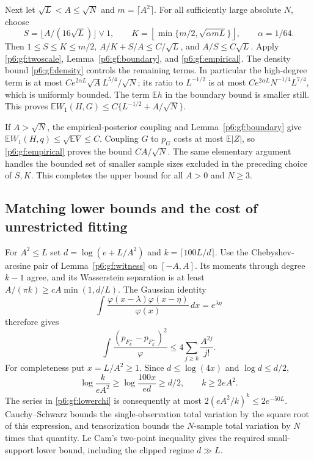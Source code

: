 \documentclass[11pt,a4paper]{article}
\theoremstyle{definition}
\theoremstyle{remark}
\numberwithin{equation}{section}
\begin{document}
Next let $\sqrt L<A\le\sqrt N$ and $m=\lceil A^2\rceil$.
For all sufficiently large absolute $N$, choose
\[
 S=\lfloor A/(16\sqrt L)\rfloor\vee1,\qquad
 K=\left\lfloor\min\{m/2,\sqrt{\alpha mL}\}\right\rfloor,
                           \qquad \alpha=1/64.
\]
Then $1\le S\le K\le m/2$, $A/K+S/A\le C/\sqrt L$, and
$A/S\le C\sqrt L$.  Apply \eqref{p6:gf:twoscale},
Lemma~\ref{p6:gf:boundary}, and \eqref{p6:gf:empirical}.
The density bound \eqref{p6:gf:density} controls the remaining terms.
In particular the high-degree term is at most
$C e^{2\alpha L}\sqrt A L^{5/4}/\sqrt N$; its ratio to
$L^{-1/2}$ is at most
$C e^{2\alpha L}N^{-1/4}L^{7/4}$, which is uniformly bounded.
The term $\mathbb E h$ in the boundary bound is smaller still.
This proves $\mathbb EW_1(H,G)\le C\{L^{-1/2}+A/\sqrt N\}$.

If $A>\sqrt N$, the empirical-posterior coupling and
Lemma~\ref{p6:gf:boundary} give
$\mathbb EW_1(H,q)\le\sqrt{\mathbb EV}\le C$.
Coupling $G$ to $p_G$ costs at most $\mathbb E|Z|$, so
\eqref{p6:gf:empirical} proves the bound $CA/\sqrt N$.
The same elementary argument handles the bounded set of smaller
sample sizes excluded in the preceding choice of $S,K$.
This completes the upper bound for all $A>0$ and $N\ge3$.

\subsection{Matching lower bounds and the cost of unrestricted fitting}

For $A^2\le L$ set $d=\log(e+L/A^2)$ and
$k=\lceil100L/d\rceil$.  Use the Chebyshev-arcsine pair of
Lemma~\ref{p6:gf:witness} on $[-A,A]$.  Its moments through degree
$k-1$ agree, and its Wasserstein separation is at least
$A/(\pi k)\ge cA\min(1,d/L)$.
The Gaussian identity
\[
 \int\frac{\varphi(x-\lambda)\varphi(x-\eta)}{\varphi(x)}\,dx
                       =e^{\lambda\eta}
\]
therefore gives
\begin{equation}\label{p6:gf:lowerchi}
 \int\frac{(p_{F_k^+}-p_{F_k^-})^2}{\varphi}
                   \le4\sum_{j\ge k}\frac{A^{2j}}{j!}.
\end{equation}
For completeness put $x=L/A^2\ge1$.
Since $d\le\log(4x)$ and $\log d\le d/2$,
\[
 \log\frac{k}{eA^2}\ge\log\frac{100x}{ed}\ge d/2,
                  \qquad k\ge2eA^2.
\]
The series in \eqref{p6:gf:lowerchi} is consequently at most
$2(eA^2/k)^k\le2e^{-50L}$.
Cauchy--Schwarz bounds the single-observation total variation by
the square root of this expression, and tensorization bounds the
$N$-sample total variation by $N$ times that quantity.
Le Cam's two-point inequality gives the required small-support
lower bound, including the clipped regime $d\gg L$.
\end{document}
